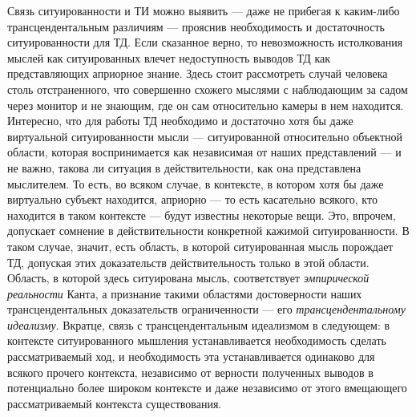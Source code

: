 \documentclass{article}
\begin{document}
Связь ситуированности и ТИ можно выявить — даже не прибегая к каким-либо трансцендентальным различиям — прояснив необходимость и достаточность ситуированности для ТД. Если сказанное верно, то невозможность истолкования мыслей как ситуированных влечет недоступность выводов ТД как представляющих априорное знание. Здесь стоит рассмотреть случай человека столь отстраненного, что совершенно схожего мыслями с наблюдающим за садом через монитор и не знающим, где он сам относительно камеры в нем находится. Интересно, что для работы ТД необходимо и достаточно хотя бы даже виртуальной ситуированности мысли — ситуированной относительно объектной области, которая воспринимается как независимая от наших представлений — и не важно, такова ли ситуация в действительности, как она представлена мыслителем. То есть, во всяком случае, в контексте, в котором хотя бы даже виртуально субъект находится, априорно — то есть касательно всякого, кто находится в таком контексте — будут известны некоторые вещи. Это, впрочем, допускает сомнение в действительности конкретной кажимой ситуированности. В таком случае, значит, есть область, в которой ситуированная мысль порождает ТД, допуская этих доказательств действительность только в этой области. Область, в которой здесь ситуирована мысль, соответствует \textit{эмпирической реальности} Канта, а признание такими областями достоверности наших трансцендентальных доказательств ограниченности — его \textit{трансцендентальному идеализму}. Вкратце, связь с трансцендентальным идеализмом в следующем: в контексте ситуированного мышления устанавливается необходимость сделать рассматриваемый ход, и необходимость эта устанавливается одинаково для всякого прочего контекста, независимо от верности полученных выводов в потенциально более широком контексте и даже независимо от этого вмещающего рассматриваемый контекста существования.
\end{document}
